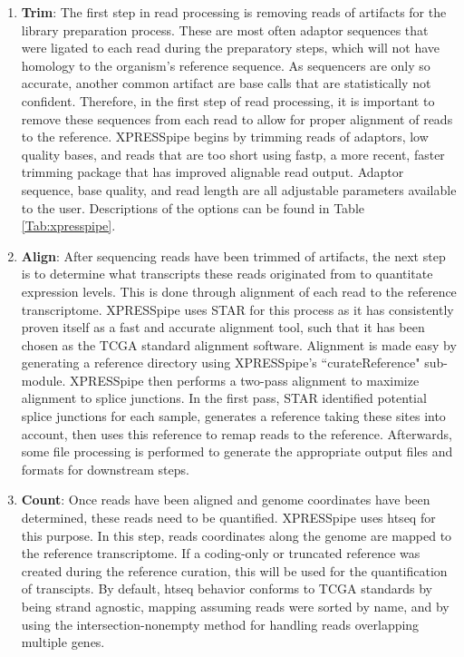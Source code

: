 \documentclass[11pt, a4paper, oneside]{article}
\begin{document}
\begin{enumerate}
  \item \textbf{Trim}: The first step in read processing is removing reads of artifacts for the library preparation process. These are most often adaptor sequences that were ligated to each read during the preparatory steps, which will not have homology to the organism's reference sequence. As sequencers are only so accurate, another common artifact are base calls that are statistically not confident. Therefore, in the first step of read processing, it is important to remove these sequences from each read to allow for proper alignment of reads to the reference. XPRESSpipe begins by trimming reads of adaptors, low quality bases, and reads that are too short using fastp, a more recent, faster trimming package that has improved alignable read output{}. Adaptor sequence, base quality, and read length are all adjustable parameters available to the user. Descriptions of the options can be found in Table \ref{Tab:xpresspipe}.
  \item \textbf{Align}: After sequencing reads have been trimmed of artifacts, the next step is to determine what transcripts these reads originated from to quantitate expression levels. This is done through alignment of each read to the reference transcriptome. XPRESSpipe uses STAR{} for this process as it has consistently proven itself as a fast and accurate alignment tool{}, such that it has been chosen as the TCGA standard alignment software. Alignment is made easy by generating a reference directory using XPRESSpipe's ``curateReference" sub-module. XPRESSpipe then performs a two-pass alignment to maximize alignment to splice junctions. In the first pass, STAR identified potential splice junctions for each sample, generates a reference taking these sites into account, then uses this reference to remap reads to the reference. Afterwards, some file processing is performed to generate the appropriate output files and formats for downstream steps.
  \item \textbf{Count}: Once reads have been aligned and genome coordinates have been determined, these reads need to be quantified. XPRESSpipe uses htseq{} for this purpose. In this step, reads coordinates along the genome are mapped to the reference transcriptome. If a coding-only or truncated reference was created during the reference curation, this will be used for the quantification of transcipts. By default, htseq behavior conforms to TCGA standards by being strand agnostic, mapping assuming reads were sorted by name, and by using the intersection-nonempty method for handling reads overlapping multiple genes.

\end{enumerate}
\end{document}
